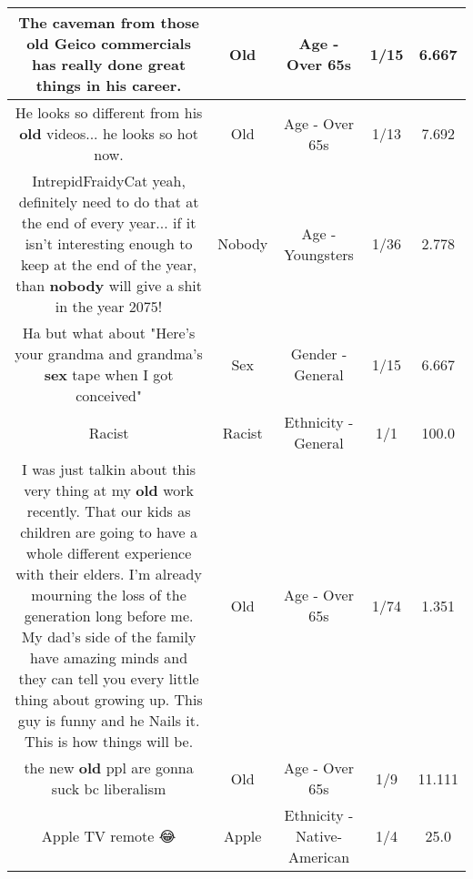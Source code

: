 \documentclass[11pt]{article}
\newlength\mylength
\begin{document}
\begin{center}
\begin{longtable}{|C{.65\mylength}|C{.30\mylength}|C{.12\mylength}|C{.12\mylength}|C{.12\mylength}|}
  \small The caveman from those \textbf{old} Geico commercials has really done great things in his career.\normalsize   & Old & Age - Over 65s & 1/15 & 6.667 \\  \hline
  \small He looks so different from his \textbf{old} videos... he looks so hot now.\normalsize   & Old & Age - Over 65s & 1/13 & 7.692 \\  \hline
  \small IntrepidFraidyCat yeah, definitely need to do that at the end of every year... if it isn't interesting enough to keep at the end of the year, than \textbf{nobody} will give a shit in the year 2075!\normalsize   & Nobody & Age - Youngsters & 1/36 & 2.778 \\  \hline
  \small Ha but what about "Here's your grandma and grandma's \textbf{sex} tape when I got conceived"\normalsize   & Sex & Gender - General & 1/15 & 6.667 \\  \hline
  \small Racist\normalsize   & Racist & Ethnicity - General & 1/1 & 100.0 \\  \hline
  \small I was just talkin about this very thing at my \textbf{old} work recently. That our kids as children are going to have a whole different experience with their elders. I'm already mourning the loss of the generation long before me. My dad's side of the family have amazing minds and they can tell you every little thing about growing up. This guy is funny and he Nails it. This is how things will be.\normalsize   & Old & Age - Over 65s & 1/74 & 1.351 \\  \hline
  \small the new \textbf{old} ppl are gonna suck bc liberalism\normalsize   & Old & Age - Over 65s & 1/9 & 11.111 \\  \hline
  \small Apple TV remote 😂\normalsize   & Apple & Ethnicity - Native-American & 1/4 & 25.0 \\  \hline

\end{longtable}
\end{center}
\end{document}
